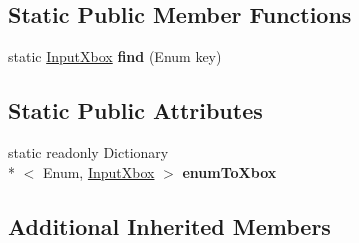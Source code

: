 \subsection*{Static Public Member Functions}
\begin{DoxyCompactItemize}
\item 
\hypertarget{class_input_xbox_a50cd04ae597a6b0794b41ce607e5d7ff}{static \hyperlink{class_input_xbox}{Input\-Xbox} {\bfseries find} (Enum key)}\label{class_input_xbox_a50cd04ae597a6b0794b41ce607e5d7ff}

\end{DoxyCompactItemize}
\subsection*{Static Public Attributes}
\begin{DoxyCompactItemize}
\item 
static readonly Dictionary\\*
$<$ Enum, \hyperlink{class_input_xbox}{Input\-Xbox} $>$ {\bfseries enum\-To\-Xbox}
\end{DoxyCompactItemize}
\subsection*{Additional Inherited Members}


